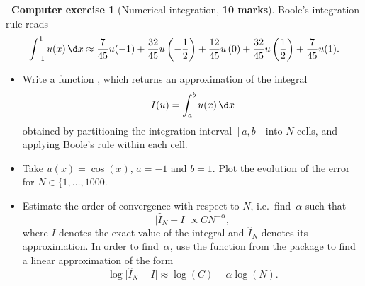 \documentclass[10pt]{article}
\theoremstyle{definition}
\newtheorem{compexercise}{{\normalfont \faLaptop}~Computer exercise}
\theoremstyle{remark}
\begin{document}
\begin{compexercise}
    [Numerical integration, \textbf{10 marks}]
    Boole's integration rule reads
    \[
        \int_{-1}^{1} u(x) \, \d x
        \approx \frac{7}{45} u(-1) + \frac{32}{45} u\left(-\frac{1}{2}\right) + \frac{12}{45} u\left(0\right) + \frac{32}{45} u\left(\frac{1}{2}\right) + \frac{7}{45} u(1).
    \]
    \begin{itemize}
        \item
            Write a function ,
            which returns an approximation of the integral
            \[
                I(u) = \int_{a}^{b} u(x) \, \d x
            \]
            obtained by partitioning the integration interval $[a, b]$ into $N$ cells,
            and applying Boole's rule within each cell.

        \item
            Take $u(x) = \cos(x)$, $a = -1$ and $b = 1$.
            Plot the evolution of the error for $N \in \{1, \dotsc, 1000$.

        \item
            Estimate the order of convergence with respect to $N$, i.e.\ find~$\alpha$ such that
            \[
                \lvert \widehat I_{N} - I \rvert \propto C N^{-\alpha},
            \]
            where $I$ denotes the exact value of the integral
            and $\widehat I_{N}$ denotes its approximation.
            In order to find~$\alpha$,
            use the function  from the  package to find a linear approximation
            of the form
            \[
                \log \lvert \widehat I_{N} - I \rvert \approx \log (C) - \alpha \log(N).
            \]
    \end{itemize}
\end{compexercise}
\end{document}
